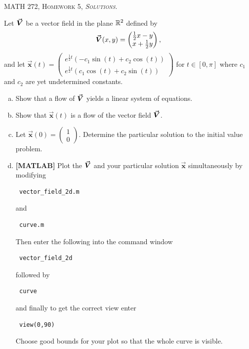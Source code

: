 \documentclass[12pt]{article} %
\newcommand{\vecx}{\boldsymbol{\vec{x}}}
\begin{document}
\begin{center}
   \textsc{\large MATH 272, Homework 5, \emph{Solutions}.}
\end{center}
\vspace{.5cm}

\begin{problem}
Let $\boldsymbol{\vec{V}}$ be a vector field in the plane $\mathbb{R}^2$ defined by
\[
\boldsymbol{\vec{V}}(x,y) = \begin{pmatrix} \frac{1}{2}x-y \\ x + \frac{1}{2}y \end{pmatrix},
\]
and let $\vecx(t) = \begin{pmatrix}  e^{\frac{1}{2}t} (-c_1 \sin(t) + c_2 \cos(t) ) \\ e^{\frac{1}{2}t} (c_1 \cos(t) + c_2 \sin(t)) \end{pmatrix}$ for $t\in [0,\pi]$ where $c_1$ and $c_2$ are yet undetermined constants.
\begin{enumerate}[(a)]
    \item Show that a flow of $\boldsymbol{\vec{V}}$ yields a linear system of equations.
    \item Show that $\vecx(t)$ is a flow of the vector field $\boldsymbol{\vec{V}}$.
    \item Let $\vecx(0)=\begin{pmatrix} 1 \\ 0 \end{pmatrix}$. Determine the particular solution to the initial value problem.
    \item \textbf{[MATLAB]} Plot the $\boldsymbol{\vec{V}}$ and your particular solution $\vecx$ simultaneously by modifying 
\begin{verbatim} vector_field_2d.m \end{verbatim}
 and
 \begin{verbatim} curve.m \end{verbatim} 
Then enter the following into the command window
\begin{verbatim} vector_field_2d \end{verbatim}
 followed by 
\begin{verbatim} curve \end{verbatim}
and finally to get the correct view enter
\begin{verbatim} view(0,90) \end{verbatim}
Choose good bounds for your plot so that the whole curve is visible.
\end{enumerate}
\end{problem}
\end{document}

